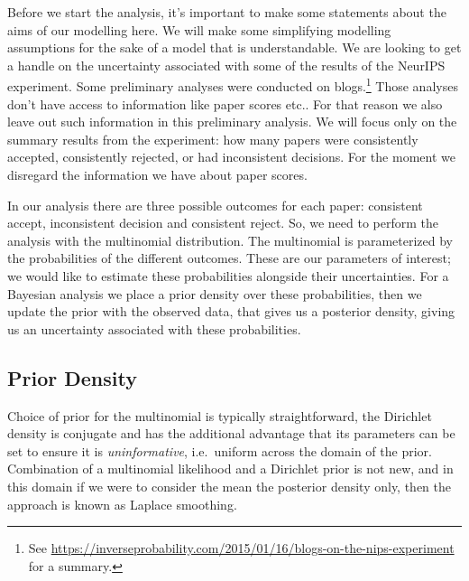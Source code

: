 Before we start the analysis, it's important to make some statements
about the aims of our modelling here. We will make some simplifying
modelling assumptions for the sake of a model that is understandable. We
are looking to get a handle on the uncertainty associated with some of
the results of the NeurIPS experiment.
Some
preliminary analyses were conducted on blogs.\footnote{See \url{https://inverseprobability.com/2015/01/16/blogs-on-the-nips-experiment} for a summary.} Those
analyses don't have access to information like paper scores etc.. For
that reason we also leave out such information in this preliminary
analysis. We will focus only on the summary results from the experiment:
how many papers were consistently accepted, consistently rejected, or
had inconsistent decisions. For the moment we disregard the information
we have about paper scores.

In our analysis there are three possible outcomes for each paper:
consistent accept, inconsistent decision and consistent reject. So, we
need to perform the analysis with the
multinomial
distribution. The multinomial is parameterized by the probabilities of
the different outcomes. These are our parameters of interest; we would
like to estimate these probabilities alongside their uncertainties. For 
a Bayesian analysis we place a prior density over these
probabilities, then we update the prior with the observed data, that
gives us a posterior density, giving us an uncertainty associated with
these probabilities.

\subsection{Prior Density}\label{prior-density}

Choice of prior for the multinomial is typically straightforward, the Dirichlet
density is
conjugate and has
the additional advantage that its parameters can be set to ensure it is
\emph{uninformative}, i.e.~uniform across the domain of the prior.
Combination of a multinomial likelihood and a Dirichlet prior is not
new, and in this domain if we were to consider the mean the posterior
density only, then the approach is known as
Laplace
smoothing.

